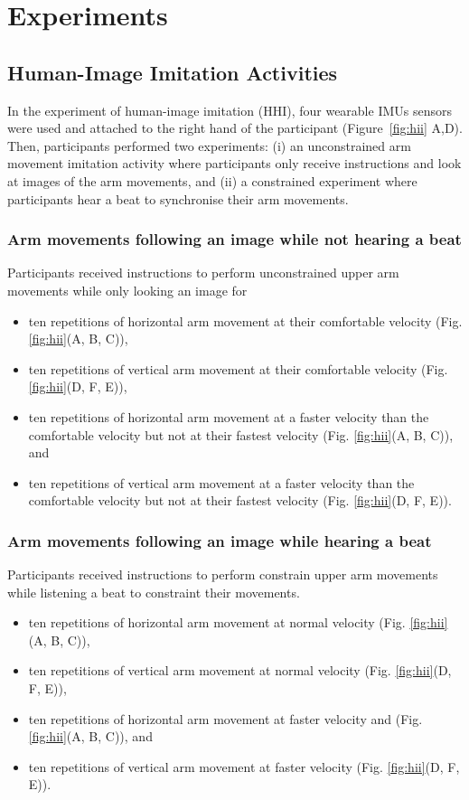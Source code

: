 \section{Experiments}

\subsection{Human-Image Imitation Activities} \label{sec:experiment:hii}
In the experiment of human-image imitation (HHI), four wearable IMUs sensors 
were used and attached to the right hand of the participant 
(Figure~\ref{fig:hii} A,D). 
Then, participants performed two experiments: 
(i) an unconstrained arm movement imitation activity where participants 
only receive instructions and look at images of the arm movements, and
(ii) a constrained experiment where participants hear a beat 
to synchronise their arm movements. 

\subsubsection{Arm movements following an image while not hearing a beat}
Participants received instructions to perform unconstrained upper arm 
movements while only looking an image for
\begin{itemize}[noitemsep,topsep=0pt]
\item ten repetitions of horizontal arm movement at their comfortable velocity
(Fig. \ref{fig:hii}(A, B, C)), 
\item ten repetitions of vertical arm movement at their comfortable velocity 
(Fig. \ref{fig:hii}(D, F, E)),
\item ten repetitions of horizontal arm movement at a faster velocity than 
the comfortable velocity but not at their fastest velocity 
(Fig. \ref{fig:hii}(A, B, C)), and 
\item ten repetitions of vertical arm movement at a faster velocity than the 
comfortable velocity but not at their fastest velocity
(Fig. \ref{fig:hii}(D, F, E)).
\end{itemize}

\subsubsection{Arm movements following an image while hearing a beat}
Participants received instructions to perform constrain upper arm movements 
while listening a beat to constraint their movements. 
\begin{itemize}[noitemsep,topsep=0pt]
\item ten repetitions of horizontal arm movement at normal velocity
(Fig. \ref{fig:hii}(A, B, C)), 
\item ten repetitions of vertical arm movement at normal velocity
(Fig. \ref{fig:hii}(D, F, E)), 
\item ten repetitions of horizontal arm movement at faster velocity and
(Fig. \ref{fig:hii}(A, B, C)), and 
\item ten repetitions of vertical arm movement at faster velocity
(Fig. \ref{fig:hii}(D, F, E)).
\end{itemize}

